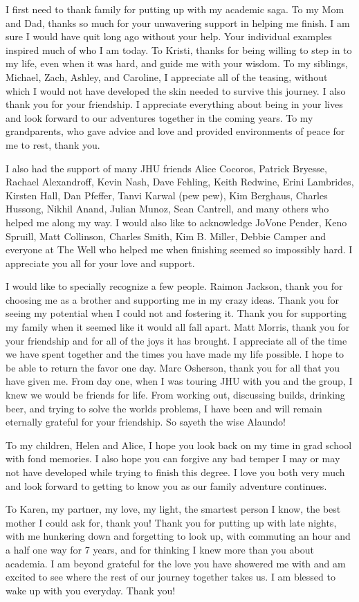 
I first need to thank family for putting up with my academic saga. 
To my Mom and Dad, thanks so much for your unwavering support in helping me finish.
I am sure I would have quit long ago without your help. Your individual examples inspired much of who I am today.
To Kristi, thanks for being willing to step in to my life, even when it was hard, and guide me with your wisdom.
To my siblings, Michael, Zach, Ashley, and Caroline, I appreciate all of the teasing, without which I would not have developed the skin needed to survive this journey.
I also thank you for your friendship. I appreciate everything about being in your lives and look forward to our adventures together in the coming years.
To my grandparents, who gave advice and love and provided environments of peace for me to rest, thank you.

I also had the support of many JHU friends Alice Cocoros, Patrick Bryesse, Rachael Alexandroff, Kevin Nash, Dave Fehling, Keith Redwine, Erini Lambrides, Kirsten Hall, Dan Pfeffer, Tanvi Karwal (pew pew), Kim Berghaus, Charles Hussong, Nikhil Anand, Julian Munoz, Sean Cantrell, and many others who helped me along my way.
I would also like to acknowledge JoVone Pender, Keno Spruill, Matt Collinson, Charles Smith, Kim B. Miller, Debbie Camper and everyone at The Well who helped me when finishing seemed so impossibly hard. I appreciate you all for your love and support. 

I would like to specially recognize a few people. 
Raimon Jackson, thank you for choosing me as a brother and supporting me in my crazy ideas. Thank you for seeing my potential when I could not and fostering it. Thank you for supporting my family when it seemed like it would all fall apart. 
Matt Morris, thank you for your friendship and for all of the joys it has brought. I appreciate all of the time we have spent together and the times you have made my life possible. I hope to be able to return the favor one day.
Marc Osherson, thank you for all that you have given me. From day one, when I was touring JHU with you and the group, I knew we would be friends for life. From working out, discussing builds, drinking beer, and trying to solve the worlds problems, I have been and will remain eternally grateful for your friendship. So sayeth the wise Alaundo!

To my children, Helen and Alice, I hope you look back on my time in grad school with fond memories. I also hope you can forgive any bad temper I may or may not have developed while trying to finish this degree. I love you both very much and look forward to getting to know you as our family adventure continues. 

To Karen, my partner, my love, my light, the smartest person I know, the best mother I could ask for, thank you! Thank you for putting up with late nights, with me hunkering down and forgetting to look up, with commuting an hour and a half one way for 7 years, and for thinking I knew more than you about academia.
I am beyond grateful for the love you have showered me with and am excited to see where the rest of our journey together takes us. I am blessed to wake up with you everyday. Thank you!